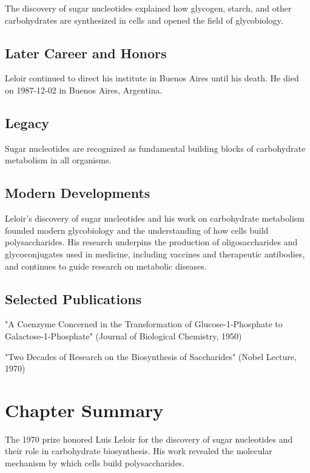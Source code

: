 The discovery of sugar nucleotides explained how glycogen, starch, and other carbohydrates are synthesized in cells and opened the field of glycobiology.

\subsection*{Later Career and Honors}

Leloir continued to direct his institute in Buenos Aires until his death. He died on 1987-12-02 in Buenos Aires, Argentina.

\subsection*{Legacy}

Sugar nucleotides are recognized as fundamental building blocks of carbohydrate metabolism in all organisms.

\subsection*{Modern Developments}

Leloir's discovery of sugar nucleotides and his work on carbohydrate metabolism founded modern glycobiology and the understanding of how cells build polysaccharides. His research underpins the production of oligosaccharides and glycoconjugates used in medicine, including vaccines and therapeutic antibodies, and continues to guide research on metabolic diseases.

\subsection*{Selected Publications}

"A Coenzyme Concerned in the Transformation of Glucose-1-Phosphate to Galactose-1-Phosphate" (Journal of Biological Chemistry, 1950)

"Two Decades of Research on the Biosynthesis of Saccharides" (Nobel Lecture, 1970)

\clearpage

\section*{Chapter Summary}

The 1970 prize honored Luis Leloir for the discovery of sugar nucleotides and their role in carbohydrate biosynthesis. His work revealed the molecular mechanism by which cells build polysaccharides.

